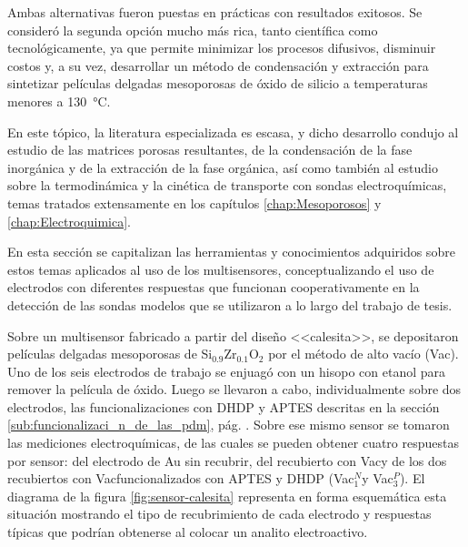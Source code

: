 			Ambas alternativas fueron puestas en prácticas con resultados exitosos. Se consideró la segunda opción mucho más rica, tanto científica como tecnológicamente, ya que permite minimizar los procesos difusivos, disminuir costos y, a su vez, desarrollar un método de condensación y extracción para sintetizar películas delgadas mesoporosas de óxido de silicio a temperaturas menores a \SI{130}{\celsius}. 

			En este tópico, la literatura especializada es escasa, y dicho desarrollo condujo al estudio de las matrices porosas resultantes, de la condensación de la fase inorgánica y de la extracción de la fase orgánica, así como también al estudio sobre la termodinámica y la cinética de transporte con sondas electroquímicas, temas tratados extensamente en los capítulos  \ref{chap:Mesoporosos} y \ref{chap:Electroquimica}. 

    		En esta sección se capitalizan las herramientas y conocimientos adquiridos sobre estos temas aplicados al uso de los multisensores, conceptualizando el uso de electrodos con diferentes respuestas que funcionan cooperativamente en la detección de las sondas modelos que se utilizaron a lo largo del trabajo de tesis. 

			Sobre un multisensor fabricado a partir del diseño <<calesita>>, se depositaron películas delgadas mesoporosas de Si$_{0.9}$Zr$_{0.1}$O$_2$ por el método de alto vacío (Vac\pdmZ). Uno de los seis electrodos de trabajo se enjuagó con un hisopo  con etanol para remover la película de óxido. Luego se llevaron a cabo, individualmente sobre dos electrodos, las funcionalizaciones con DHDP y APTES descritas en la sección \ref{sub:funcionalizaci_n_de_las_pdm}, pág. \pageref{sub:funcionalizaci_n_de_las_pdm}. Sobre ese mismo sensor se tomaron las mediciones electroquímicas, de las cuales se pueden obtener cuatro respuestas por sensor: del electrodo de Au sin recubrir, del recubierto con Vac\pdmZ\space y de los dos recubiertos con Vac\pdmZ\space funcionalizados con APTES y DHDP (Vac\pdmZ$^N_1$\space y  Vac\pdmZ$^P_3$). El diagrama de la figura \ref{fig:sensor-calesita} representa en forma esquemática esta situación mostrando el tipo de recubrimiento de cada electrodo y respuestas típicas que podrían obtenerse al colocar un analito electroactivo. 


